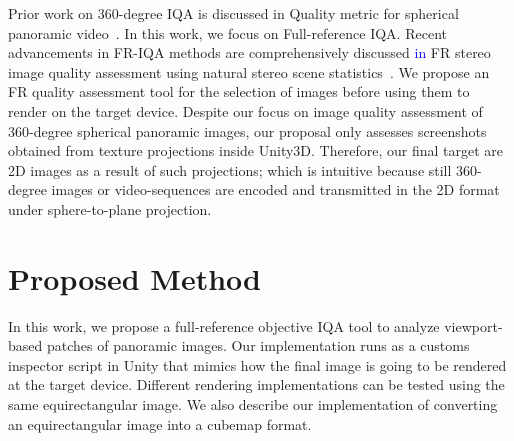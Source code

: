 \documentclass[10pt,conference]{IEEEtran}
\begin{document}
Prior work on 360-degree IQA is discussed in Quality metric for spherical panoramic video~\cite{zakharchenko2016quality}. In this work, we focus on Full-reference IQA. Recent advancements in FR-IQA methods are comprehensively discussed \textcolor{blue}{in} FR stereo image quality assessment using natural stereo scene statistics~\cite{md2015full}.  We propose an FR quality assessment tool for the selection of images before using them to render on the target device. Despite our focus on image quality assessment of 360-degree spherical panoramic images, our proposal only assesses screenshots obtained from texture projections inside Unity3D. Therefore, our final target are 2D images as a result of such projections; which is intuitive because still 360-degree images or video-sequences are encoded and transmitted in the 2D format under sphere-to-plane projection.

\section{Proposed Method}\label{sec:proposedMethod}

In this work, we propose a full-reference objective IQA tool to analyze viewport-based patches of panoramic images. Our implementation runs as a customs inspector script in Unity that mimics how the final image is going to be rendered at the target device. Different rendering implementations can be tested using the same equirectangular image. We also describe our implementation of converting an equirectangular image into a cubemap format.
\end{document}
